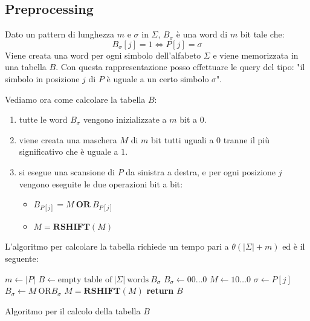 \subsection{Preprocessing}
Dato un pattern di lunghezza $m$ e $\sigma$ in $\Sigma$, $B_{\sigma}$ è una word di $m$ bit tale che:
\begin{equation}
    B_{\sigma}[j] = 1 \iff P[j] = \sigma
\end{equation}
Viene creata una word per ogni simbolo dell'alfabeto $\Sigma$ e viene memorizzata in una tabella $B$. Con questa rappresentazione posso effettuare le query del tipo: "il simbolo in posizione $j$ di $P$ è uguale a un certo simbolo $\sigma$".

Vediamo ora come calcolare la tabella $B$:
\begin{enumerate}
    \item tutte le word $B_{\sigma}$ vengono inizializzate a $m$ bit a $0$.
    \item viene creata una maschera $M$ di $m$ bit tutti uguali a $0$ tranne il più significativo che è uguale a $1$.
    \item si esegue una scansione di $P$ da sinistra a destra, e per ogni posizione $j$ vengono eseguite le due operazioni bit a bit:
    \begin{itemize}
        \item $B_{P[j]} = M \ \textbf{OR} \ B_{P[j]}$
        \item $M = \textbf{RSHIFT} (M)$
    \end{itemize}
\end{enumerate}
L'algoritmo per calcolare la tabella richiede un tempo pari a $\theta(|\Sigma| + m)$ ed è il seguente:
\begin{algorithm}
  \begin{algorithmic}
        \State $m \gets |P|$
        \State $B \gets \text{empty table of} \ |\Sigma| \ \text{words} \ B_{\sigma}$
        \For{$\sigma \in \Sigma$}
            \State $B_{\sigma} \gets 00\dots0$
        \EndFor
        \State $M \gets 10\dots0$
        \For{$\sigma \in \Sigma$}
            \State $\sigma \gets P[j]$
            \State $B_{\sigma} \gets M \ \text{OR} B_{\sigma}$
            \State $M = \textbf{RSHIFT} (M)$
        \EndFor
        \State \textbf{return} $B$
    \EndFunction
  \end{algorithmic}
  \caption{Algoritmo per il calcolo della tabella $B$}
\end{algorithm}
